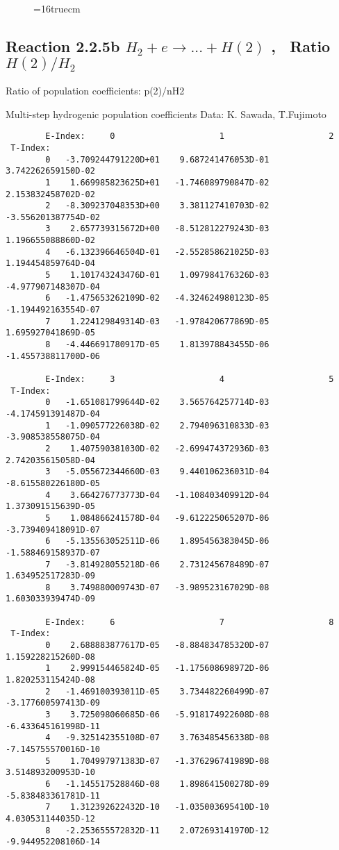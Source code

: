 \documentclass[12pt,dvipdfmx]{article}
\begin{document}
\begin{figure} \label{2.2.5a}
\epsfxsize=16truecm
\end{figure}
\newpage
\subsection{
Reaction 2.2.5b  $H_2 + e \rightarrow ...+ H(2) $  , \   Ratio $H(2)/H_2 $
}

 Ratio of population coefficients: p(2)/nH2

 Multi-step hydrogenic population coefficients
 Data: K. Sawada, T.Fujimoto \cite{kn:Sawada}


\begin{small}\begin{verbatim}
        E-Index:     0                     1                     2
 T-Index:
        0   -3.709244791220D+01    9.687241476053D-01    3.742262659150D-02
        1    1.669985823625D+01   -1.746089790847D-02    2.153832458702D-02
        2   -8.309237048353D+00    3.381127410703D-02   -3.556201387754D-02
        3    2.657739315672D+00   -8.512812279243D-03    1.196655088860D-02
        4   -6.132396646504D-01   -2.552858621025D-03    1.194454859764D-04
        5    1.101743243476D-01    1.097984176326D-03   -4.977907148307D-04
        6   -1.475653262109D-02   -4.324624980123D-05   -1.194492163554D-07
        7    1.224129849314D-03   -1.978420677869D-05    1.695927041869D-05
        8   -4.446691780917D-05    1.813978843455D-06   -1.455738811700D-06

        E-Index:     3                     4                     5
 T-Index:
        0   -1.651081799644D-02    3.565764257714D-03   -4.174591391487D-04
        1   -1.090577226038D-02    2.794096310833D-03   -3.908538558075D-04
        2    1.407590381030D-02   -2.699474372936D-03    2.742035615058D-04
        3   -5.055672344660D-03    9.440106236031D-04   -8.615580226180D-05
        4    3.664276773773D-04   -1.108403409912D-04    1.373091515639D-05
        5    1.084866241578D-04   -9.612225065207D-06   -3.739409418091D-07
        6   -5.135563052511D-06    1.895456383045D-06   -1.588469158937D-07
        7   -3.814928055218D-06    2.731245678489D-07    1.634952517283D-09
        8    3.749880009743D-07   -3.989523167029D-08    1.603033939474D-09

        E-Index:     6                     7                     8
 T-Index:
        0    2.688883877617D-05   -8.884834785320D-07    1.159228215260D-08
        1    2.999154465824D-05   -1.175608698972D-06    1.820253115424D-08
        2   -1.469100393011D-05    3.734482260499D-07   -3.177600597413D-09
        3    3.725098060685D-06   -5.918174922608D-08   -6.433645161998D-11
        4   -9.325142355108D-07    3.763485456338D-08   -7.145755570016D-10
        5    1.704997971383D-07   -1.376296741989D-08    3.514893200953D-10
        6   -1.145517528846D-08    1.898641500278D-09   -5.838483361781D-11
        7    1.312392622432D-10   -1.035003695410D-10    4.030531144035D-12
        8   -2.253655572832D-11    2.072693141970D-12   -9.944952208106D-14


\end{verbatim}
\end{small}
\end{document}
